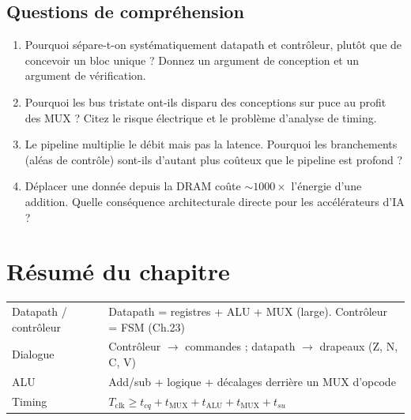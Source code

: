 \documentclass[12pt,a4paper,twoside]{book}
\begin{document}
\subsection*{Questions de compréhension}

\begin{enumerate}[nosep]
\item Pourquoi sépare-t-on systématiquement datapath et contrôleur, plutôt que de concevoir un bloc unique ? Donnez un argument de conception et un argument de vérification.
\item Pourquoi les bus tristate ont-ils disparu des conceptions sur puce au profit des MUX ? Citez le risque électrique et le problème d'analyse de timing.
\item Le pipeline multiplie le débit mais pas la latence. Pourquoi les branchements (aléas de contrôle) sont-ils d'autant plus coûteux que le pipeline est profond ?
\item Déplacer une donnée depuis la DRAM coûte $\sim 1000\times$ l'énergie d'une addition. Quelle conséquence architecturale directe pour les accélérateurs d'IA ?
\end{enumerate}

\section*{Résumé du chapitre}

\begin{bases}[title={\color{white} Résumé --- Les Bases}]
\begin{center}
\renewcommand{\arraystretch}{1.3}
\begin{tabular}{p{3.5cm}p{9.5cm}}
\toprule
Datapath / contrôleur & Datapath = registres + ALU + MUX (large). Contrôleur = FSM (Ch.23) \\
Dialogue & Contrôleur $\to$ commandes ; datapath $\to$ drapeaux (Z, N, C, V) \\
ALU & Add/sub + logique + décalages derrière un MUX d'opcode \\
Timing & $T_{\text{clk}} \geq t_{cq} + t_{\text{MUX}} + t_{\text{ALU}} + t_{\text{MUX}} + t_{su}$ \\
\bottomrule
\end{tabular}
\end{center}
\end{bases}
\end{document}
